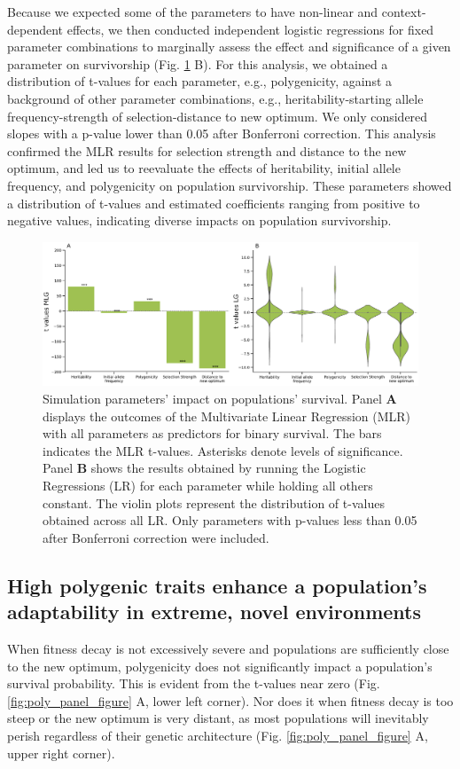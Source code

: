 \documentclass{article}
\begin{document}
Because we expected some of the parameters to have non-linear and context-dependent effects, we then conducted independent logistic regressions for fixed parameter combinations to marginally assess the effect and significance of a given parameter on survivorship (Fig. \ref{fig:glm_logisticreg} B). For this analysis, we obtained a distribution of t-values for each parameter, e.g., polygenicity, against a background of other parameter combinations, e.g., heritability-starting allele frequency-strength of selection-distance to new optimum. We only considered slopes with a p-value lower than 0.05 after Bonferroni correction. This analysis confirmed the MLR results for selection strength and distance to the new optimum, and led us to reevaluate the effects of heritability, initial allele frequency, and polygenicity on population survivorship. These parameters showed a distribution of t-values and estimated coefficients ranging from positive to negative values, indicating diverse impacts on population survivorship.

\begin{figure}[h]
  \centering
  \includegraphics[width=1\textwidth]{figures/glm_logisticreg_newver.pdf}
  \caption{Simulation parameters' impact on populations' survival. Panel \textbf{A} displays the outcomes of the Multivariate Linear Regression (MLR) with all parameters as predictors for binary survival. The bars indicates the MLR t-values. Asterisks denote levels of significance. Panel \textbf{B} shows the results obtained by running the
  Logistic Regressions (LR) for each parameter while holding all others constant. The violin plots represent the distribution of t-values obtained across all LR. Only parameters with p-values less than 0.05 after Bonferroni correction were included.}
  \label{fig:glm_logisticreg}
\end{figure}


\subsection{High polygenic traits enhance a population's adaptability in extreme, novel environments}
When fitness decay is not excessively severe and populations are sufficiently close to the new optimum, polygenicity does not significantly impact a population’s survival probability. This is evident from the t-values near zero (Fig. \ref{fig:poly_panel_figure} A, lower left corner). Nor does it when fitness decay is too steep or the new optimum is very distant, as most populations will inevitably perish regardless of their genetic architecture (Fig. \ref{fig:poly_panel_figure} A, upper right corner).
\end{document}
